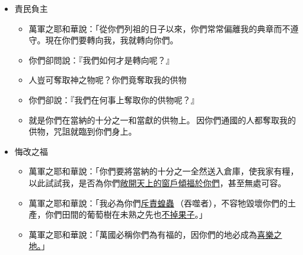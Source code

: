 \begin{itemize} 
\itemsep-.35em 
\item 責民負主\\
\begin{itemize} 
\itemsep-.35em 
\item 萬軍之耶和華說：「從你們列祖的日子以來，你們常常偏離我的典章而不遵守。現在你們要轉向我，我就轉向你們。
\item 你們卻問說：『我們如何才是轉向呢？』
\item 人豈可奪取神之物呢？你們竟奪取我的供物
\item 你們卻說：『我們在何事上奪取你的供物呢？』
\item 就是你們在當納的十分之一和當獻的供物上。 因你們通國的人都奪取我的供物，咒詛就臨到你們身上。
\end{itemize}
\item 悔改之福\\
\begin{itemize} 
\itemsep-.35em 
\item 萬軍之耶和華說：「你們要將當納的十分之一全然送入倉庫，使我家有糧，以此試試我，是否為你們\underline{敞開天上的窗戶傾福於你們}，甚至無處可容。
\item 萬軍之耶和華說：「我必為你們\underline{斥責蝗蟲} （吞噬者），不容牠毀壞你們的土產，你們田間的葡萄樹在未熟之先也\underline{不掉果子}。」
\item 萬軍之耶和華說：「萬國必稱你們為有福的，因你們的地必成為\underline{喜樂之地。}」
\end{itemize}
\end{itemize}

